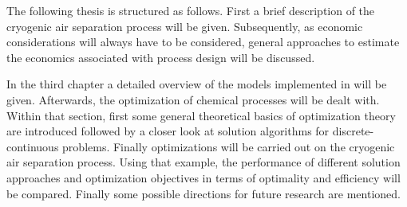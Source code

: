 The following thesis is structured as follows. First a brief description of the cryogenic air separation
process will be given. Subsequently, as economic considerations will always have to be considered,
general approaches to estimate the economics associated with process design will be discussed.

In the third chapter a detailed overview of the models implemented in \gproms will be given. Afterwards,
the optimization of chemical processes will be dealt with. Within that section, first some general theoretical
basics of optimization theory are introduced followed by a closer look at solution algorithms for
discrete-continuous problems. Finally optimizations will be carried out on the cryogenic air separation
process. Using that example, the performance of different solution approaches and optimization objectives
in terms of optimality and efficiency will be compared. Finally some possible directions for future research
are mentioned.
